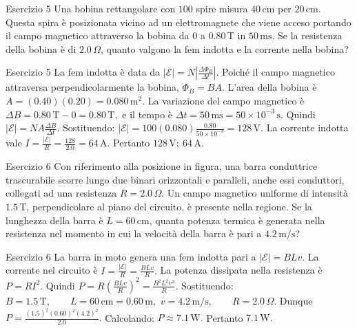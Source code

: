 \documentclass[a4paper]{article}
\begin{document}
\begin{snippetexercise}{Esercizio 5}
    Una bobina rettangolare con \(100\) spire misura \(40\,\mathrm{cm}\) per
    \(20\,\mathrm{cm}\). Questa spira è posizionata vicino ad un elettromagnete
    che viene acceso portando il campo magnetico attraverso la bobina da
    \(0\) a \(0.80\,\mathrm{T}\) in \(50\,\mathrm{ms}\). Se la resistenza
    della bobina è di \(2.0\,\Omega\), quanto valgono la fem indotta e la
    corrente nella bobina?

\end{snippetexercise}
\begin{snippetsolution}{Esercizio 5}
    La fem indotta è data da
    \(|\mathcal{E}| = N\left|\frac{\Delta \Phi_B}{\Delta t}\right|.\)
    Poiché il campo magnetico attraversa perpendicolarmente la bobina,
    \(\Phi_B = BA.\)
    L'area della bobina è
    \(A = (0.40)(0.20) = 0.080\,\mathrm{m^2}.\)
    La variazione del campo magnetico è
    \(\Delta B = 0.80\,\mathrm{T} - 0 = 0.80\,\mathrm{T},\)
    e il tempo è
    \(\Delta t = 50\,\mathrm{ms} = 50 \times 10^{-3}\,\mathrm{s}.\)
    Quindi
    \(|\mathcal{E}| = N A \frac{\Delta B}{\Delta t}.\)
    Sostituendo:
    \(|\mathcal{E}| = 100(0.080) \frac{0.80}{50 \times 10^{-3}} = 128\,\mathrm{V}.\)
    La corrente indotta vale
    \(I = \frac{|\mathcal{E}|}{R} = \frac{128}{2.0} = 64\,\mathrm{A}.\)
    Pertanto
    \(\boxed{128\,\mathrm{V};\ 64\,\mathrm{A}}.\)
\end{snippetsolution}
\begin{snippetexercise}{Esercizio 6}
    Con riferimento alla posizione in figura, una barra conduttrice trascurabile
    scorre lungo due binari orizzontali e paralleli, anche essi conduttori,
    collegati ad una resistenza \(R = 2.0\,\Omega\). Un campo magnetico
    uniforme di intensità \(1.5\,\mathrm{T}\), perpendicolare al piano del
    circuito, è presente nella regione. Se la lunghezza della barra è
    \(L = 60\,\mathrm{cm}\), quanta potenza termica è generata nella resistenza
    nel momento in cui la velocità della barra è pari a \(4.2\,\mathrm{m/s}\)?

\end{snippetexercise}
\begin{snippetsolution}{Esercizio 6}
    La barra in moto genera una fem indotta pari a
    \(|\mathcal{E}| = BLv.\)
    La corrente nel circuito è
    \(I = \frac{|\mathcal{E}|}{R} = \frac{BLv}{R}.\)
    La potenza dissipata nella resistenza è
    \(P = RI^2.\)
    Quindi
    \(P = R \left( \frac{BLv}{R} \right)^2 = \frac{B^2L^2v^2}{R}.\)
    Sostituendo:
    \(B = 1.5\,\mathrm{T}, \qquad L = 60\,\mathrm{cm}=0.60\,\mathrm{m},\)
    \(v = 4.2\,\mathrm{m/s}, \qquad R = 2.0\,\Omega.\)
    Dunque
    \(P = \frac{ (1.5)^2(0.60)^2(4.2)^2 }{2.0}.\)
    Calcolando:
    \(P \approx 7.1\,\mathrm{W}.\)
    Pertanto
    \(\boxed{7.1\,\mathrm{W}}.\)
\end{snippetsolution}
\end{document}
